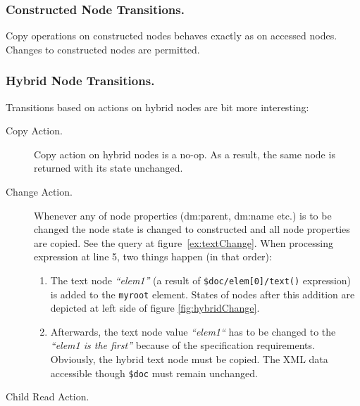 \documentclass{llncs}
\begin{document}
\subsubsection{Constructed Node Transitions.}
    Copy operations on constructed nodes behaves exactly as on accessed nodes. 
    Changes to constructed nodes are permitted.

\subsubsection{Hybrid Node Transitions.}
    Transitions based on actions on hybrid nodes are bit more interesting:

    \begin{description}
      \item[Copy Action.] Copy action on hybrid nodes is a no-op. As a 
        result, the same node is returned with its state unchanged. 
      
      \item[Change Action.] Whenever any of node properties (dm:parent, dm:name 
        etc.) is to be changed the node state is changed to constructed and all 
        node properties are copied. 
        See the query at figure~\ref{ex:textChange}. When processing expression
        at line 5, two things happen (in that order):

        \begin{enumerate}
        \item 
            The text node \emph{``elem1''} (a result of \texttt{\$doc/elem[0]/text()}
            expression) is added to the \texttt{myroot} element. 
            States of nodes after this addition are depicted at left
            side of figure \ref{fig:hybridChange}.
        
        \item 
            Afterwards, the text node value \emph{``elem1``} has to be changed 
            to the \emph{``elem1 is the first''} because of the specification
            requirements. Obviously, the hybrid text node must be copied. The 
            XML data accessible though \texttt{\$doc} must remain unchanged.
        \end{enumerate}

      \item[Child Read Action.] 


\end{description}
\end{document}
